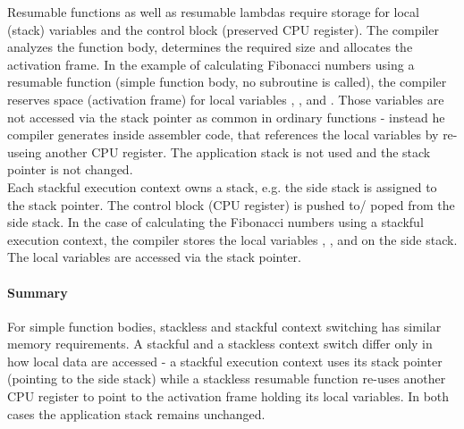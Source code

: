 Resumable functions as well as resumable lambdas require storage for local
(stack) variables and the control block (preserved CPU register). The compiler
analyzes the function body, determines the required size and allocates the
activation frame.
In the example of calculating Fibonacci numbers using a resumable function
(simple function body, no subroutine is called), the compiler reserves space
(activation frame) for local variables , ,  and .
Those variables are not accessed via the stack pointer as common in ordinary
functions - instead he compiler generates inside  assembler code,
that references the local variables by re-useing another CPU register. The
application stack is not used and the stack pointer is not changed.\\
\newline
Each stackful execution context owns a stack, e.g. the side stack is assigned to
the stack pointer. The control block (CPU register) is pushed to/ poped from the
side stack.
In the case of calculating the Fibonacci numbers using a stackful execution
context, the compiler stores the local variables , ,  and
 on the side stack. The local variables are accessed via the stack
pointer.
\paragraph*{Summary}
For simple function bodies, stackless and stackful context switching has similar
memory requirements. A stackful and a stackless context switch differ only in
how local data are accessed - a stackful execution context uses its stack
pointer (pointing to the side stack) while a stackless resumable function
re-uses another CPU register to point to the activation frame holding its local
variables. In both cases the application stack remains unchanged.

